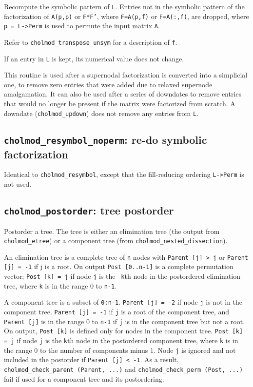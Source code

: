 \documentclass[11pt]{article}
\begin{document}

Recompute the symbolic pattern of {\tt L}.  Entries not in the symbolic pattern
of the factorization of {\tt A(p,p)} or {\tt F*F'}, where {\tt F=A(p,f)} or
{\tt F=A(:,f)}, are dropped, where {\tt p = L->Perm} is used to permute the
input matrix {\tt A}.

Refer to {\tt cholmod\_transpose\_unsym} for a description of {\tt f}.

If an entry in {\tt L} is kept, its numerical value does not change.

This routine is used after a supernodal factorization is converted into a
simplicial one, to remove zero entries that were added due to relaxed supernode
amalgamation.  It can also be used after a series of downdates to remove
entries that would no longer be present if the matrix were factorized from
scratch.  A downdate ({\tt cholmod\_updown}) does not remove any entries from
{\tt L}.

\subsection{{\tt cholmod\_resymbol\_noperm}: re-do symbolic factorization}


Identical to {\tt cholmod\_resymbol}, except that the fill-reducing ordering
{\tt L->Perm} is not used.

\subsection{{\tt cholmod\_postorder}: tree postorder}


Postorder a tree.  The tree is either an elimination tree (the output from {\tt
cholmod\_etree}) or a component tree (from {\tt cholmod\_nested\_dissection}).

An elimination tree is a complete tree of {\tt n} nodes with {\tt Parent [j] >
j} or {\tt Parent [j] = -1} if j is a root.  On output {\tt Post [0..n-1]} is a
complete permutation vector; {\tt Post [k] = j} if node {\tt j} is the {\tt
k}th node in the postordered elimination tree, where {\tt k} is in the range 0
to {\tt n-1}.

A component tree is a subset of {\tt 0:n-1}.  {\tt Parent [j] = -2} if node
{\tt j} is not in the component tree.  {\tt Parent [j] = -1} if {\tt j} is a
root of the component tree, and {\tt Parent [j]} is in the range 0 to {\tt n-1}
if {\tt j} is in the component tree but not a root.  On output, {\tt Post [k]}
is defined only for nodes in the component tree.  {\tt Post [k] = j} if node
{\tt j} is the {\tt k}th node in the postordered component tree, where {\tt k}
is in the range 0 to the number of components minus 1.  Node {\tt j} is ignored
and not included in the postorder if {\tt Parent [j] < -1}.  As a result, {\tt
cholmod\_check\_parent (Parent, ...)} and {\tt cholmod\_check\_perm (Post,
...)} fail if used for a component tree and its postordering.
\end{document}
